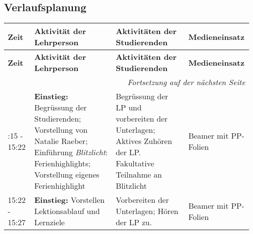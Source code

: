 \documentclass[
11pt,
captions=tableheading,
smallheadings,
headsepline,
footsepline, 
captions=tableheading,
parskip=half-,
]{scrartcl}
\begin{document}
\begin{landscape}
    \subsection{Verlaufsplanung}
    \begin{longtable}{@{}l|p{8.75cm}p{7.75cm}p{5.25cm}@{}}
        \toprule
        \textbf{Zeit} & \textbf{Aktivität der Lehrperson}                                                                                                                                & \textbf{Aktivitäten der Studierenden}                                                                          & \textbf{Medieneinsatz}                                                            \\
        \midrule
        \endfirsthead
        \toprule
        \textbf{Zeit} & \textbf{Aktivität der Lehrperson}                                                                                                                                & \textbf{Aktivitäten der Studierenden}                                                                          & \textbf{Medieneinsatz}                                                            \\
        \midrule
        \endhead
        \midrule
        \multicolumn{4}{r}{\textit{Fortsetzung auf der nächsten Seite}}                                                                                                                                                                                                                                                                                                                       \\
        \midrule
        \endfoot
        \bottomrule
        \endlastfoot
        \midrule
        15:15 - 15:22 & \textbf{Einstieg: }Begrüssung der Studierenden; Vorstellung von Natalie Raeber; Einführung \textit{Blitzlicht}: Ferienhighlights; Vorstellung eigenes Ferienhighlight               & Begrüssung der LP und vorbereiten der Unterlagen; Aktives Zuhören der LP. Fakultative Teilnahme an Blitzlicht & Beamer mit PP-Folien                                                              \\
        \midrule
        15:22 - 15:27 & \textbf{Einstieg: }Vorstellen Lektionsablauf und Lernziele                                                                                                       & Vorbereiten der Unterlagen; Hören der LP zu.                                                                   & Beamer mit PP-Folien                                                              \\


\end{longtable}
\end{landscape}
\end{document}
